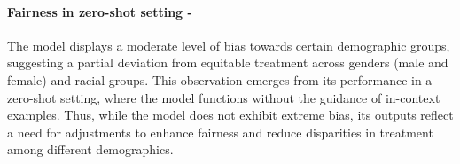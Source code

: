 \paragraph{Fairness in zero-shot setting - \moderate}
The model displays a moderate level of bias towards certain demographic groups, suggesting a partial deviation from equitable treatment across genders (male and female) and racial groups. This observation emerges from its performance in a zero-shot setting, where the model functions without the guidance of in-context examples. Thus, while the model does not exhibit extreme bias, its outputs reflect a need for adjustments to enhance fairness and reduce disparities in treatment among different demographics.
